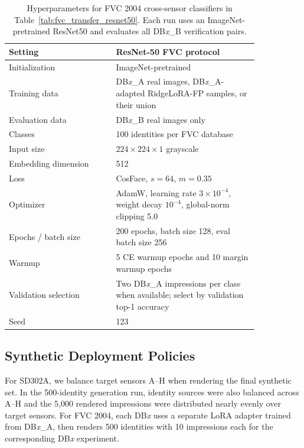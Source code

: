 \documentclass{article}
\newcommand{\method}{RidgeLoRA-FP}
\begin{document}
\begin{table}[!htbp]
    \centering
    \small
    \caption{Hyperparameters for FVC 2004 cross-sensor classifiers in
    Table~\ref{tab:fvc_transfer_resnet50}.  Each run uses an ImageNet-
    pretrained ResNet50 and evaluates all DB\emph{x}\_B verification pairs.}
    \label{tab:appendix_fvc_classifier_hparams}
    \setlength{\tabcolsep}{6pt}
    \renewcommand{\arraystretch}{1.05}
    \begin{tabular}{p{0.36\linewidth}|p{0.48\linewidth}}
        \toprule
        Setting & ResNet-50 FVC protocol \\
        \midrule
        Initialization & ImageNet-pretrained \\
        Training data & DB\emph{x}\_A real images, DB\emph{x}\_A-adapted
        \method{} samples, or their union \\
        Evaluation data & DB\emph{x}\_B real images only \\
        Classes & 100 identities per FVC database \\
        Input size & $224\times224\times1$ grayscale \\
        Embedding dimension & 512 \\
        Loss & CosFace, $s=64$, $m=0.35$ \\
        Optimizer & AdamW, learning rate $3{\times}10^{-4}$, weight decay
        $10^{-4}$, global-norm clipping 5.0 \\
        Epochs / batch size & 200 epochs, batch size 128, eval batch size 256 \\
        Warmup & 5 CE warmup epochs and 10 margin warmup epochs \\
        Validation selection & Two DB\emph{x}\_A impressions per class when
        available; select by validation top-1 accuracy \\
        Seed & 123 \\
        \bottomrule
    \end{tabular}
\end{table}
\FloatBarrier

\subsection{Synthetic Deployment Policies}

For SD302A, we balance target sensors A--H when rendering the final synthetic
set.  In the 500-identity generation run, identity sources were also balanced
across A--H and the 5,000 rendered impressions were distributed nearly evenly
over target sensors.  For FVC 2004, each DB\emph{x} uses a separate LoRA
adapter trained from DB\emph{x}\_A, then renders 500 identities with 10
impressions each for the corresponding DB\emph{x} experiment.
\end{document}
